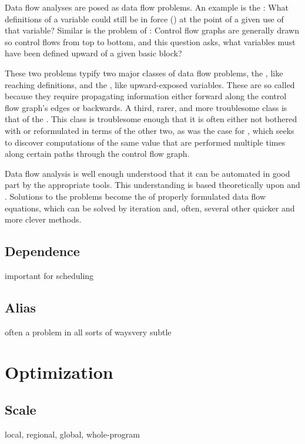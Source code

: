 Data flow analyses are posed as data flow problems. An example is the : What definitions of a variable could still be in force () at the point of a given use of that variable? Similar is the problem of : Control flow graphs are generally drawn so control flows from top to bottom, and this question asks, what variables must have been defined upward of a given basic block?

These two problems typify two major classes of data flow problems, the , like reaching definitions, and the , like upward-exposed variables. These are so called because they require propagating information either forward along the control flow graph's edges or backwards. A third, rarer, and more troublesome class is that of the . This class is troublesome enough that it is often either not bothered with or reformulated in terms of the other two, as was the case for , which seeks to discover computations of the same value that are performed multiple times along certain paths through the control flow graph.

Data flow analysis is well enough understood that it can be automated in good part by the appropriate tools. This understanding is based theoretically upon  and . Solutions to the problems become the  of properly formulated data flow equations, which can be solved by iteration and, often, several other quicker and more clever methods. %

\subsection{Dependence}
important for scheduling

\subsection{Alias}
often a problem in all sorts of ways\empause very subtle

\section{Optimization}
\subsection{Scale}
local, regional, global, whole-program

